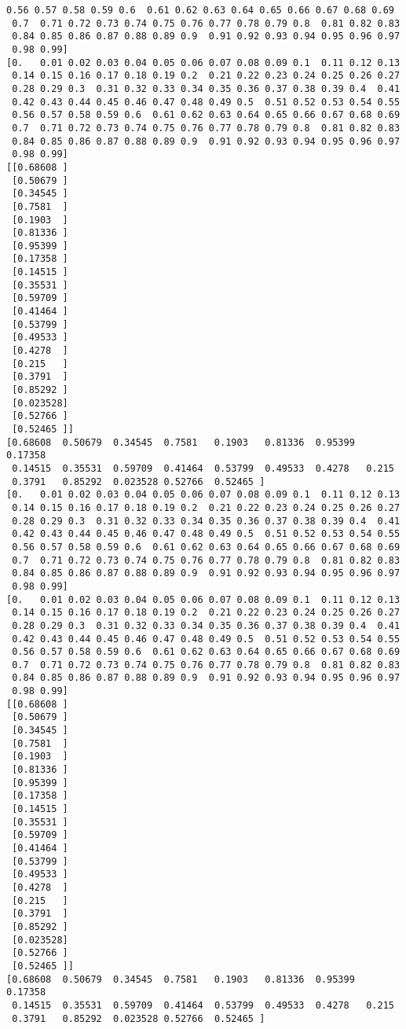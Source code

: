 \documentclass[11pt]{article}
\begin{document}
\begin{Verbatim}[commandchars=\\\{\}]
 0.56 0.57 0.58 0.59 0.6  0.61 0.62 0.63 0.64 0.65 0.66 0.67 0.68 0.69
 0.7  0.71 0.72 0.73 0.74 0.75 0.76 0.77 0.78 0.79 0.8  0.81 0.82 0.83
 0.84 0.85 0.86 0.87 0.88 0.89 0.9  0.91 0.92 0.93 0.94 0.95 0.96 0.97
 0.98 0.99]
[0.   0.01 0.02 0.03 0.04 0.05 0.06 0.07 0.08 0.09 0.1  0.11 0.12 0.13
 0.14 0.15 0.16 0.17 0.18 0.19 0.2  0.21 0.22 0.23 0.24 0.25 0.26 0.27
 0.28 0.29 0.3  0.31 0.32 0.33 0.34 0.35 0.36 0.37 0.38 0.39 0.4  0.41
 0.42 0.43 0.44 0.45 0.46 0.47 0.48 0.49 0.5  0.51 0.52 0.53 0.54 0.55
 0.56 0.57 0.58 0.59 0.6  0.61 0.62 0.63 0.64 0.65 0.66 0.67 0.68 0.69
 0.7  0.71 0.72 0.73 0.74 0.75 0.76 0.77 0.78 0.79 0.8  0.81 0.82 0.83
 0.84 0.85 0.86 0.87 0.88 0.89 0.9  0.91 0.92 0.93 0.94 0.95 0.96 0.97
 0.98 0.99]
[[0.68608 ]
 [0.50679 ]
 [0.34545 ]
 [0.7581  ]
 [0.1903  ]
 [0.81336 ]
 [0.95399 ]
 [0.17358 ]
 [0.14515 ]
 [0.35531 ]
 [0.59709 ]
 [0.41464 ]
 [0.53799 ]
 [0.49533 ]
 [0.4278  ]
 [0.215   ]
 [0.3791  ]
 [0.85292 ]
 [0.023528]
 [0.52766 ]
 [0.52465 ]]
[0.68608  0.50679  0.34545  0.7581   0.1903   0.81336  0.95399  0.17358
 0.14515  0.35531  0.59709  0.41464  0.53799  0.49533  0.4278   0.215
 0.3791   0.85292  0.023528 0.52766  0.52465 ]
[0.   0.01 0.02 0.03 0.04 0.05 0.06 0.07 0.08 0.09 0.1  0.11 0.12 0.13
 0.14 0.15 0.16 0.17 0.18 0.19 0.2  0.21 0.22 0.23 0.24 0.25 0.26 0.27
 0.28 0.29 0.3  0.31 0.32 0.33 0.34 0.35 0.36 0.37 0.38 0.39 0.4  0.41
 0.42 0.43 0.44 0.45 0.46 0.47 0.48 0.49 0.5  0.51 0.52 0.53 0.54 0.55
 0.56 0.57 0.58 0.59 0.6  0.61 0.62 0.63 0.64 0.65 0.66 0.67 0.68 0.69
 0.7  0.71 0.72 0.73 0.74 0.75 0.76 0.77 0.78 0.79 0.8  0.81 0.82 0.83
 0.84 0.85 0.86 0.87 0.88 0.89 0.9  0.91 0.92 0.93 0.94 0.95 0.96 0.97
 0.98 0.99]
[0.   0.01 0.02 0.03 0.04 0.05 0.06 0.07 0.08 0.09 0.1  0.11 0.12 0.13
 0.14 0.15 0.16 0.17 0.18 0.19 0.2  0.21 0.22 0.23 0.24 0.25 0.26 0.27
 0.28 0.29 0.3  0.31 0.32 0.33 0.34 0.35 0.36 0.37 0.38 0.39 0.4  0.41
 0.42 0.43 0.44 0.45 0.46 0.47 0.48 0.49 0.5  0.51 0.52 0.53 0.54 0.55
 0.56 0.57 0.58 0.59 0.6  0.61 0.62 0.63 0.64 0.65 0.66 0.67 0.68 0.69
 0.7  0.71 0.72 0.73 0.74 0.75 0.76 0.77 0.78 0.79 0.8  0.81 0.82 0.83
 0.84 0.85 0.86 0.87 0.88 0.89 0.9  0.91 0.92 0.93 0.94 0.95 0.96 0.97
 0.98 0.99]
[[0.68608 ]
 [0.50679 ]
 [0.34545 ]
 [0.7581  ]
 [0.1903  ]
 [0.81336 ]
 [0.95399 ]
 [0.17358 ]
 [0.14515 ]
 [0.35531 ]
 [0.59709 ]
 [0.41464 ]
 [0.53799 ]
 [0.49533 ]
 [0.4278  ]
 [0.215   ]
 [0.3791  ]
 [0.85292 ]
 [0.023528]
 [0.52766 ]
 [0.52465 ]]
[0.68608  0.50679  0.34545  0.7581   0.1903   0.81336  0.95399  0.17358
 0.14515  0.35531  0.59709  0.41464  0.53799  0.49533  0.4278   0.215
 0.3791   0.85292  0.023528 0.52766  0.52465 ]

\end{Verbatim}
\end{document}
